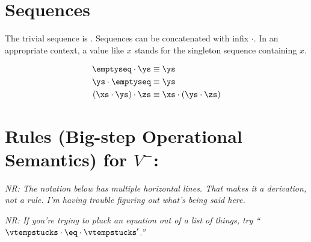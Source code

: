\documentclass[]{article}
\newcommand\nr[1]{\leavevmode\emph{NR: #1}}
\begin{document}
\section{Sequences}

The trivial sequence is \emptyseq. Sequences can be concatenated with infix 
$\cdot$. In an appropriate context, a value like $x$ stands for 
the singleton sequence containing $x$. 

\begin{align*}
    \emptyseq \cdot \ys &\equiv \ys \\
    \ys \cdot \emptyseq &\equiv \ys \\
    (\xs \cdot \ys) \cdot \zs &\equiv \xs \cdot (\ys \cdot \zs)
\end{align*}

\section{Rules (Big-step Operational Semantics) for $V^{-}$:}
    

\newcommand\GeCtxStuckRule[1][Left]{%
\inferrule*[#1=\textsc{ (Ge-Ctx-Stuck) }]
    {\inferrule*{}{\EquationTempStuck} 
    \and
    \inferrule*{}{\CtxToRho}
    \and 
    \inferrule*{}{\EvalGeSucc[\rhohat]}
    }
    {\GeEqCtxEval}
}

\mpar{\GeCtxStuckRule}



\nr{The notation below has multiple horizontal lines.  That makes it a
derivation, not a rule.  I'm having trouble figuring out what's being
said here.}




\newcommand\GeEqStuckRule{%
\inferrule*[Left=\textsc{ (Ge-Eq-Succ) }]
{\GeCtxStuckRule[Right]}
{\GeCtxEqEval}
}

\mpar{\GeEqStuckRule}

\nr{If you're trying to pluck an equation out of a list of things, try
``$\vtempstucks \cdot \eq \cdot \vtempstucks'$.''}
\end{document}
